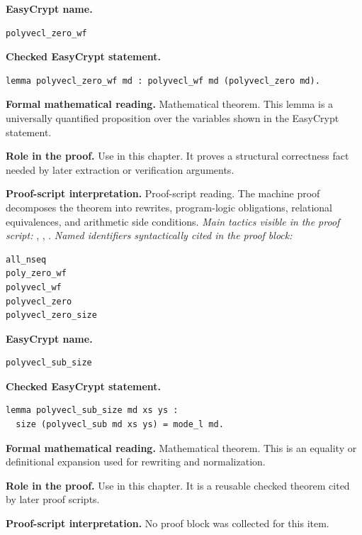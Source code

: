 \begin{formaltheorem}
\noindent\textbf{EasyCrypt name.}
\begin{lstlisting}[language=EasyCrypt,basicstyle=\ttfamily\scriptsize]
polyvecl_zero_wf
\end{lstlisting}
\noindent\textbf{Checked EasyCrypt statement.}
\begin{lstlisting}[language=EasyCrypt,basicstyle=\ttfamily\scriptsize]
lemma polyvecl_zero_wf md : polyvecl_wf md (polyvecl_zero md).
\end{lstlisting}
\noindent\textbf{Formal mathematical reading.}
Mathematical theorem. This lemma is a universally quantified proposition over the variables shown in the EasyCrypt statement.

\noindent\textbf{Role in the proof.}
Use in this chapter. It proves a structural correctness fact needed by later extraction or verification arguments.

\noindent\textbf{Proof-script interpretation.}
Proof-script reading. The machine proof decomposes the theorem into rewrites, program-logic obligations, relational equivalences, and arithmetic side conditions.
\emph{Main tactics visible in the proof script:} , , .
\emph{Named identifiers syntactically cited in the proof block:}
\begin{lstlisting}[language=EasyCrypt,basicstyle=\ttfamily\scriptsize]
all_nseq
poly_zero_wf
polyvecl_wf
polyvecl_zero
polyvecl_zero_size
\end{lstlisting}

\end{formaltheorem}

\begin{formaltheorem}
\noindent\textbf{EasyCrypt name.}
\begin{lstlisting}[language=EasyCrypt,basicstyle=\ttfamily\scriptsize]
polyvecl_sub_size
\end{lstlisting}
\noindent\textbf{Checked EasyCrypt statement.}
\begin{lstlisting}[language=EasyCrypt,basicstyle=\ttfamily\scriptsize]
lemma polyvecl_sub_size md xs ys :
  size (polyvecl_sub md xs ys) = mode_l md.
\end{lstlisting}
\noindent\textbf{Formal mathematical reading.}
Mathematical theorem. This is an equality or definitional expansion used for rewriting and normalization.

\noindent\textbf{Role in the proof.}
Use in this chapter. It is a reusable checked theorem cited by later proof scripts.

\noindent\textbf{Proof-script interpretation.}
No proof block was collected for this item.

\end{formaltheorem}

